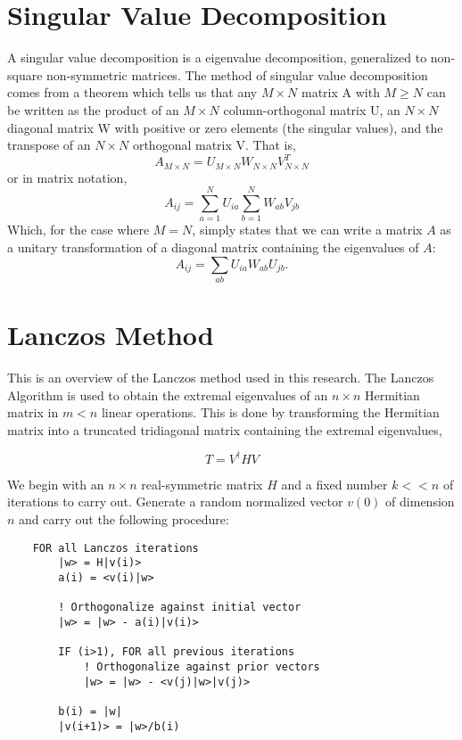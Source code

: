 \section{Singular Value Decomposition}
\label{appendix: svd}
A singular value decomposition is a eigenvalue decomposition, 
generalized to non-square non-symmetric matrices. 
The method of singular value decomposition comes from a theorem 
which tells us that any $M \times N$ matrix A with $M \geq N$ can be written as
 the product of an $M \times N$ column-orthogonal matrix U, an $N \times N$ diagonal 
 matrix W with positive or zero elements (the singular values), and 
 the transpose of an $N \times N$ orthogonal matrix V\cite{NumRec}.
That is,
\begin{equation}
	A_{M \times N} = U_{M \times N} W_{N \times N} V_{N \times N}^T
\end{equation}
or in matrix notation,
\begin{equation}
	A_{ij} =  \sum_{a=1}^N U_{ia}  \sum_{b=1}^{N} W_{ab} V_{jb}
\end{equation}
Which, for the case where $M=N$, simply states that we can write a matrix $A$ as
a unitary transformation of a diagonal matrix containing the eigenvalues of $A$:
\begin{equation}
	A_{ij} = \sum_{ab}U_{ia}W_{ab}U_{jb}.
\end{equation}


\section{Lanczos Method}

This is an overview of the Lanczos method\cite{lanczos} used in this research. The 
Lanczos Algorithm is used to obtain the extremal eigenvalues of an $n \times n$
Hermitian matrix in $m<n$ linear operations. This is done by transforming the
Hermitian matrix into a truncated tridiagonal matrix containing the extremal 
eigenvalues,

\begin{equation}
    T = V^\dagger H V
\end{equation}

We begin with an $n \times n$ real-symmetric matrix $H$ and a fixed number $k<<n$
of iterations to carry out. Generate a random normalized vector $v(0)$ of dimension 
$n$ and carry out the following procedure:

\begin{verbatim}
    FOR all Lanczos iterations
        |w> = H|v(i)>
        a(i) = <v(i)|w>

        ! Orthogonalize against initial vector
        |w> = |w> - a(i)|v(i)>  

        IF (i>1), FOR all previous iterations
            ! Orthogonalize against prior vectors
            |w> = |w> - <v(j)|w>|v(j)> 

        b(i) = |w|
        |v(i+1)> = |w>/b(i)            
\end{verbatim}    

